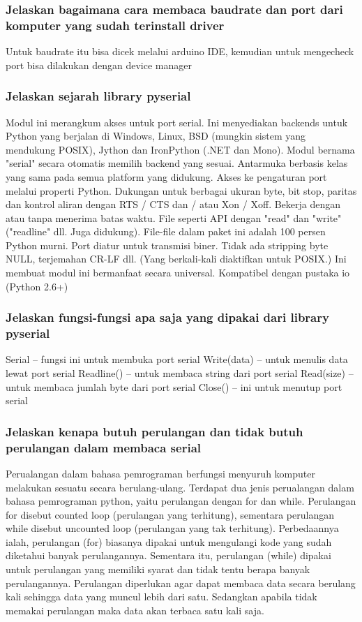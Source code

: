\subsubsection{Jelaskan bagaimana cara membaca baudrate dan port dari komputer yang sudah terinstall driver}
Untuk baudrate itu bisa dicek melalui arduino IDE, kemudian untuk mengecheck port bisa dilakukan dengan device manager

\subsubsection{Jelaskan sejarah library pyserial}
Modul ini merangkum akses untuk port serial. Ini menyediakan backends untuk Python yang berjalan di Windows, Linux, BSD (mungkin sistem yang mendukung POSIX), Jython dan IronPython (.NET dan Mono). Modul bernama "serial" secara otomatis memilih backend yang sesuai. Antarmuka berbasis kelas yang sama pada semua platform yang didukung.
Akses ke pengaturan port melalui properti Python.
Dukungan untuk berbagai ukuran byte, bit stop, paritas dan kontrol aliran dengan RTS / CTS dan / atau Xon / Xoff.
Bekerja dengan atau tanpa menerima batas waktu.
File seperti API dengan "read" dan "write" ("readline" dll. Juga didukung).
File-file dalam paket ini adalah 100 persen Python murni.
Port diatur untuk transmisi biner. Tidak ada stripping byte NULL, terjemahan CR-LF dll. (Yang berkali-kali diaktifkan untuk POSIX.) Ini membuat modul ini bermanfaat secara universal.
Kompatibel dengan pustaka io (Python 2.6+)

\subsubsection{Jelaskan fungsi-fungsi apa saja yang dipakai dari library pyserial}


Serial – fungsi ini untuk membuka port serial
Write(data) – untuk menulis data lewat port serial
Readline() – untuk membaca string dari port serial
Read(size) – untuk membaca jumlah byte dari port serial
Close() – ini untuk menutup port serial 

\subsubsection{Jelaskan kenapa butuh perulangan dan tidak butuh perulangan dalam membaca serial}


Perualangan dalam bahasa pemrograman berfungsi menyuruh komputer melakukan sesuatu secara berulang-ulang. Terdapat dua jenis perualangan dalam bahasa pemrograman python, yaitu perulangan dengan for dan while.
Perulangan for disebut counted loop (perulangan yang terhitung), sementara perulangan while disebut uncounted loop (perulangan yang tak terhitung). Perbedaannya ialah, perulangan (for) biasanya dipakai untuk mengulangi kode yang sudah diketahui banyak perulangannya. Sementara itu, perulangan (while) dipakai untuk perulangan yang memiliki syarat dan tidak tentu berapa banyak perulangannya.
Perulangan diperlukan agar dapat membaca data secara berulang kali sehingga data yang muncul lebih dari satu. Sedangkan apabila tidak memakai perulangan maka data akan terbaca satu kali saja.

